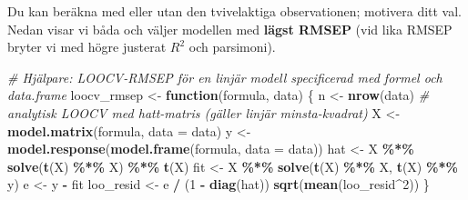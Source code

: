 \documentclass[
  11pt,
]{article}
\newenvironment{Shaded}{\begin{snugshade}}{\end{snugshade}}
\newcommand{\AttributeTok}[1]{\textcolor[rgb]{0.13,0.29,0.53}{#1}}
\newcommand{\CommentTok}[1]{\textcolor[rgb]{0.56,0.35,0.01}{\textit{#1}}}
\newcommand{\ControlFlowTok}[1]{\textcolor[rgb]{0.13,0.29,0.53}{\textbf{#1}}}
\newcommand{\DecValTok}[1]{\textcolor[rgb]{0.00,0.00,0.81}{#1}}
\newcommand{\FunctionTok}[1]{\textcolor[rgb]{0.13,0.29,0.53}{\textbf{#1}}}
\newcommand{\NormalTok}[1]{#1}
\newcommand{\OtherTok}[1]{\textcolor[rgb]{0.56,0.35,0.01}{#1}}
\newcommand{\SpecialCharTok}[1]{\textcolor[rgb]{0.81,0.36,0.00}{\textbf{#1}}}
\begin{document}
Du kan beräkna med eller utan den tvivelaktiga observationen; motivera
ditt val. Nedan visar vi båda och väljer modellen med \textbf{lägst
RMSEP} (vid lika RMSEP bryter vi med högre justerat \(R^2\) och
parsimoni).

\begin{Shaded}
\begin{Highlighting}[]
\CommentTok{\# Hjälpare: LOOCV{-}RMSEP för en linjär modell specificerad med formel och data.frame}
\NormalTok{loocv\_rmsep }\OtherTok{\textless{}{-}} \ControlFlowTok{function}\NormalTok{(formula, data) \{}
\NormalTok{  n }\OtherTok{\textless{}{-}} \FunctionTok{nrow}\NormalTok{(data)}
  \CommentTok{\# analytisk LOOCV med hatt{-}matris (gäller linjär minsta{-}kvadrat)}
\NormalTok{  X }\OtherTok{\textless{}{-}} \FunctionTok{model.matrix}\NormalTok{(formula, }\AttributeTok{data =}\NormalTok{ data)}
\NormalTok{  y }\OtherTok{\textless{}{-}} \FunctionTok{model.response}\NormalTok{(}\FunctionTok{model.frame}\NormalTok{(formula, }\AttributeTok{data =}\NormalTok{ data))}
\NormalTok{  hat }\OtherTok{\textless{}{-}}\NormalTok{ X }\SpecialCharTok{\%*\%} \FunctionTok{solve}\NormalTok{(}\FunctionTok{t}\NormalTok{(X) }\SpecialCharTok{\%*\%}\NormalTok{ X) }\SpecialCharTok{\%*\%} \FunctionTok{t}\NormalTok{(X)}
\NormalTok{  fit }\OtherTok{\textless{}{-}}\NormalTok{ X }\SpecialCharTok{\%*\%} \FunctionTok{solve}\NormalTok{(}\FunctionTok{t}\NormalTok{(X) }\SpecialCharTok{\%*\%}\NormalTok{ X, }\FunctionTok{t}\NormalTok{(X) }\SpecialCharTok{\%*\%}\NormalTok{ y)}
\NormalTok{  e }\OtherTok{\textless{}{-}}\NormalTok{ y }\SpecialCharTok{{-}}\NormalTok{ fit}
\NormalTok{  loo\_resid }\OtherTok{\textless{}{-}}\NormalTok{ e }\SpecialCharTok{/}\NormalTok{ (}\DecValTok{1} \SpecialCharTok{{-}} \FunctionTok{diag}\NormalTok{(hat))}
  \FunctionTok{sqrt}\NormalTok{(}\FunctionTok{mean}\NormalTok{(loo\_resid}\SpecialCharTok{\^{}}\DecValTok{2}\NormalTok{))}
\NormalTok{\}}


\end{Highlighting}
\end{Shaded}
\end{document}
